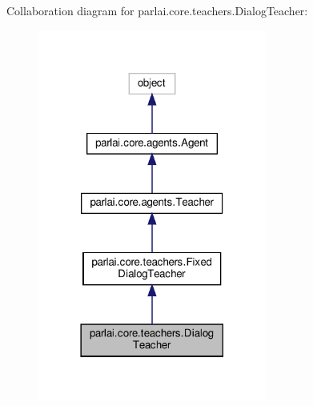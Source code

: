 Collaboration diagram for parlai.\+core.\+teachers.\+Dialog\+Teacher\+:
\nopagebreak
\begin{figure}[H]
\begin{center}
\leavevmode
\includegraphics[width=213pt]{d6/d8e/classparlai_1_1core_1_1teachers_1_1DialogTeacher__coll__graph}
\end{center}
\end{figure}
